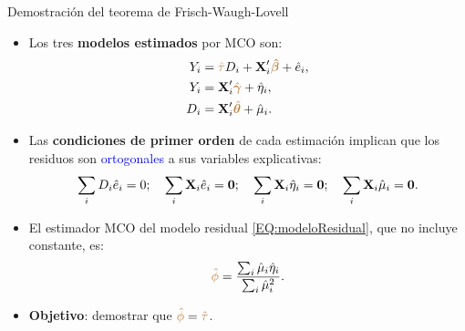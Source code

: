 \documentclass[9pt, xcolor=dvipsnames]{beamer}
\begin{document}
\begin{frame}{Demostración del teorema de Frisch-Waugh-Lovell}\label{ANEX:FWL}
\begin{itemize}
    \item Los tres \textbf{modelos estimados} por MCO son:
    \begin{align*}
    \begin{split}
        Y_i &= \textcolor{brown}{\hat{\tau}} D_i + \textbf{X}'_i\textcolor{brown}{\boldsymbol{\hat{\beta}}} + \hat{e}_i, \\
        Y_i &= \textbf{X}'_i\textcolor{brown}{\hat{\boldsymbol{\gamma}}} + \hat{\eta}_i, \\
        D_i &= \textbf{X}'_i\textcolor{brown}{\hat{\boldsymbol{\theta}}} + \hat{\mu}_i.
    \end{split}
    \end{align*}
    \item Las \textbf{condiciones de primer orden} de cada estimación implican que los residuos son \textcolor{blue}{ortogonales} a sus variables explicativas:
    \begin{align*}
    \begin{split}
        \sum_i D_i \hat{e}_i = 0; \quad \sum_i \textbf{X}_i \hat{e}_i = \textbf{0}; \quad \sum_i \textbf{X}_i \hat{\eta}_i = \textbf{0}; \quad \sum_i \textbf{X}_i \hat{\mu}_i = \textbf{0}.
    \end{split}
    \end{align*}
    \item El estimador MCO del modelo residual \eqref{EQ:modeloResidual}, que no incluye constante, es:
    \begin{align*}
    \begin{split}
        \textcolor{brown}{\hat{\phi}} = \frac{\sum_i \hat{\mu}_i \hat{\eta}_i}{\sum_i \hat{\mu}^2_i}.
    \end{split}
    \end{align*}
    \item \textbf{Objetivo}: demostrar que \(\textcolor{brown}{\hat{\phi}} = \textcolor{brown}{\hat{\tau}}\).
\end{itemize}
\end{frame}
\end{document}
